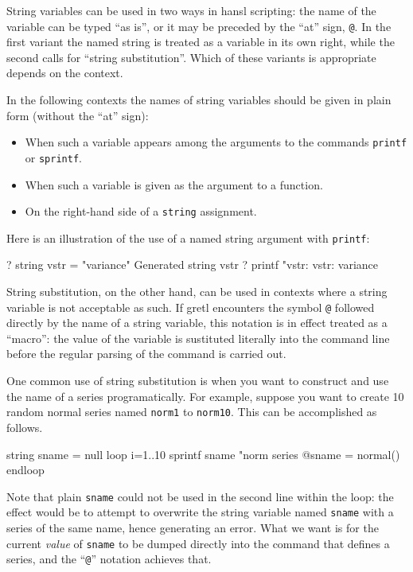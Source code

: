 String variables can be used in two ways in hansl scripting: the name
of the variable can be typed ``as is'', or it may be preceded by the
``at'' sign, \verb|@|. In the first variant the named string is
treated as a variable in its own right, while the second calls for
``string substitution''. Which of these variants is appropriate
depends on the context.

In the following contexts the names of string variables should be
given in plain form (without the ``at'' sign):

\begin{itemize}
\item When such a variable appears among the arguments to the
  commands \texttt{printf} or \texttt{sprintf}.
\item When such a variable is given as the argument to a function.
\item On the right-hand side of a \texttt{string} assignment.
\end{itemize}

Here is an illustration of the use of a named string argument with
\texttt{printf}:
%
\begin{code}
? string vstr = "variance"
Generated string vstr
? printf "vstr: %
vstr:     variance
\end{code}

String substitution, on the other hand, can be used in contexts where
a string variable is not acceptable as such. If gretl encounters
the symbol \verb|@| followed directly by the name of a string
variable, this notation is in effect treated as a ``macro'': the value
of the variable is sustituted literally into the command line before
the regular parsing of the command is carried out.

One common use of string substitution is when you want to construct
and use the name of a series programatically. For example, suppose you
want to create 10 random normal series named \texttt{norm1} to
\texttt{norm10}. This can be accomplished as follows.
%
\begin{code}
string sname = null
loop i=1..10
  sprintf sname "norm%
  series @sname = normal()
endloop
\end{code}
%
Note that plain \texttt{sname} could not be used in the second line
within the loop: the effect would be to attempt to overwrite the
string variable named \texttt{sname} with a series of the same name,
hence generating an error. What we want is for the current
\textit{value} of \texttt{sname} to be dumped directly into the
command that defines a series, and the ``\verb|@|'' notation achieves
that.

